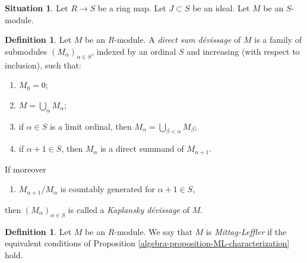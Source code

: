 \documentclass{amsart}
\theoremstyle{plain}
\theoremstyle{definition}
\newtheorem{definition}[subsection]{Definition}
\newtheorem{situation}[subsection]{Situation}
\theoremstyle{remark}
\numberwithin{equation}{subsection}
\begin{document}
\begin{situation}
\label{more-algebra-situation-flattening-general}
Let $R \to S$ be a ring map. Let $J \subset S$ be an ideal.
Let $M$ be an $S$-module.
\end{situation}

\begin{definition}
\label{algebra-definition-devissage}
Let $M$ be an $R$-module.  A {\it direct sum d\'evissage} of $M$ is a family
of submodules $(M_{\alpha})_{\alpha \in S}$, indexed by an ordinal $S$ and
increasing (with respect to inclusion), such that:
\begin{enumerate}
\item[(0)] $M_0 = 0$;
\item[(1)] $M = \bigcup_{\alpha} M_{\alpha}$;
\item[(2)] if $\alpha \in S$ is a limit ordinal, then $M_{\alpha} =
\bigcup_{\beta < \alpha} M_{\beta}$;
\item[(3)] if $\alpha + 1 \in S$, then $M_{\alpha}$ is a direct summand of
$M_{\alpha + 1}$.
\end{enumerate}
If moreover
\begin{enumerate}
\item[(4)] $M_{\alpha + 1}/M_{\alpha}$ is countably generated for
$\alpha + 1 \in S$,
\end{enumerate}
then $(M_{\alpha})_{\alpha \in S}$ is called a {\it Kaplansky d\'evissage}
of $M$.
\end{definition}

\begin{definition}
\label{algebra-definition-mittag-leffler-module}
Let $M$ be an $R$-module.  We say that $M$ is {\it Mittag-Leffler} if the
equivalent conditions of
Proposition \ref{algebra-proposition-ML-characterization}
hold.
\end{definition}
\end{document}
